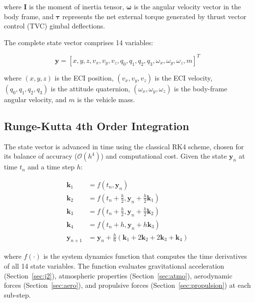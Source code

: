 \documentclass[conference]{IEEEtran}
\newcommand{\vect}[1]{\boldsymbol{#1}}
\newcommand{\mat}[1]{\mathbf{#1}}
\begin{document}
\noindent where $\mat{I}$ is the moment of inertia tensor, $\vect{\omega}$ is the angular velocity vector in the body frame, and $\vect{\tau}$ represents the net external torque generated by thrust vector control (TVC) gimbal deflections.

The complete state vector comprises 14 variables:

\begin{equation}
    \vect{y} = [x, y, z, v_x, v_y, v_z, q_0, q_1, q_2, q_3, \omega_x, \omega_y, \omega_z, m]^T
    \label{eq:state_vector}
\end{equation}

\noindent where $(x, y, z)$ is the ECI position, $(v_x, v_y, v_z)$ is the ECI velocity, $(q_0, q_1, q_2, q_3)$ is the attitude quaternion, $(\omega_x, \omega_y, \omega_z)$ is the body-frame angular velocity, and $m$ is the vehicle mass.

\subsection{Runge-Kutta 4th Order Integration}

The state vector is advanced in time using the classical RK4 scheme, chosen for its balance of accuracy ($\mathcal{O}(h^4)$) and computational cost. Given the state $\vect{y}_n$ at time $t_n$ and a time step $h$:

\begin{align}
    \vect{k}_1 &= f(t_n, \vect{y}_n) \label{eq:rk4_k1} \\
    \vect{k}_2 &= f\!\left(t_n + \frac{h}{2}, \vect{y}_n + \frac{h}{2}\vect{k}_1\right) \label{eq:rk4_k2} \\
    \vect{k}_3 &= f\!\left(t_n + \frac{h}{2}, \vect{y}_n + \frac{h}{2}\vect{k}_2\right) \label{eq:rk4_k3} \\
    \vect{k}_4 &= f(t_n + h, \vect{y}_n + h\vect{k}_3) \label{eq:rk4_k4} \\
    \vect{y}_{n+1} &= \vect{y}_n + \frac{h}{6}\left(\vect{k}_1 + 2\vect{k}_2 + 2\vect{k}_3 + \vect{k}_4\right) \label{eq:rk4_update}
\end{align}

\noindent where $f(\cdot)$ is the system dynamics function that computes the time derivatives of all 14 state variables. The function evaluates gravitational acceleration (Section~\ref{sec:j2}), atmospheric properties (Section~\ref{sec:atmo}), aerodynamic forces (Section~\ref{sec:aero}), and propulsive forces (Section~\ref{sec:propulsion}) at each sub-step.
\end{document}
